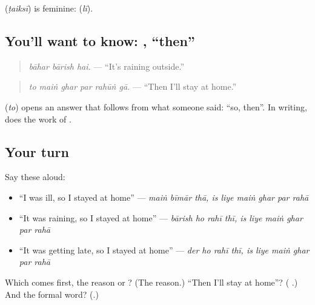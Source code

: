 \textbf{} (\emph{ṭaiksī}) is feminine: \textbf{} (\emph{lī}).

\subsection*{You'll want to know: , \textquotedblleft{}then\textquotedblright{}}
\begin{quote}
\textbf{  }
\end{quote}

\begin{quote}
\emph{bāhar bārish hai.} — \textquotedblleft{}It's raining outside.\textquotedblright{}
\end{quote}

\begin{quote}
\textbf{     }
\end{quote}

\begin{quote}
\emph{to maiṅ ghar par rahūṅ gā.} — \textquotedblleft{}Then I'll stay at home.\textquotedblright{}
\end{quote}

\textbf{} (\emph{to}) opens an answer that follows from what someone said: \textquotedblleft{}so, then\textquotedblright{}. In writing, \textbf{} does the work of \textbf{ }.

\subsection*{Your turn}
Say these aloud:

\begin{itemize}
\raggedright
  \item \textquotedblleft{}I was ill, so I stayed at home\textquotedblright{} — \emph{maiṅ bīmār thā, is liye maiṅ ghar par rahā}
  \item \textquotedblleft{}It was raining, so I stayed at home\textquotedblright{} — \emph{bārish ho rahī thī, is liye maiṅ ghar par rahā}
  \item \textquotedblleft{}It was getting late, so I stayed at home\textquotedblright{} — \emph{der ho rahī thī, is liye maiṅ ghar par rahā}
\end{itemize}

\begin{tcolorbox}[breakable,colback=teal!4,colframe=teal!35!black,title={Before you move on}]
Which comes first, the reason or \textbf{ }? (The reason.) \textquotedblleft{}Then I'll stay at home\textquotedblright{}? (\textbf{     }.) And the formal word? (\textbf{}.)
\end{tcolorbox}
